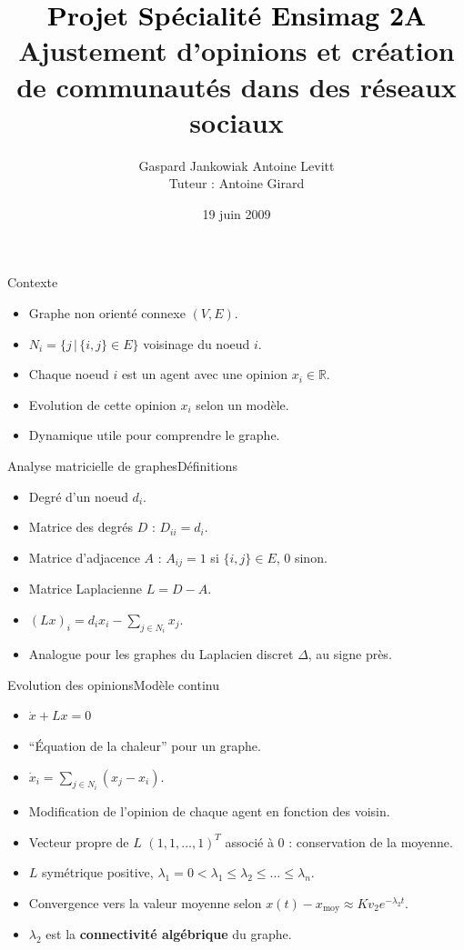 \documentclass{beamer}
\author{Gaspard Jankowiak \quad Antoine Levitt\\ Tuteur : Antoine Girard}
\title{{\textbf{\textcolor{black}{Projet Spécialité Ensimag 2A}}}\vspace{1cm}\\ {Ajustement d'opinions et création de communautés dans des réseaux
sociaux}}
\date{19 juin 2009}
\begin{document}
\begin{frame}
	\maketitle
\end{frame}

\begin{frame}{Contexte}
  \begin{itemize}
  \item Graphe non orienté connexe $(V, E)$.
  \item $N_i = \{j\, |\, \{i, j\} \in E\}$ voisinage du noeud $i$.
  \item Chaque noeud $i$ est un agent avec une opinion $x_i \in
    \mathbb {R}$.
  \item Evolution de cette opinion $x_i$ selon un modèle.
  \item Dynamique utile pour comprendre le graphe.
  \end{itemize}
\end{frame}

\begin{frame}{Analyse matricielle de graphes}{Définitions}
  \begin{itemize}
  \item Degré d'un noeud $d_i$.
  \item Matrice des degrés $D$ : $D_{i i} = d_i$.
  \item Matrice d'adjacence $A$ : $A_{i j} = 1$ si $\{i,j\} \in E$,
    $0$ sinon.
  \item Matrice Laplacienne $L = D - A$.
  \item $(L x)_i = d_i x_i - \sum_{j \in N_i} x_j$.
  \item Analogue pour les graphes du Laplacien discret $\Delta$, au signe près.
  \end{itemize}
\end{frame}

\begin{frame}{Evolution des opinions}{Modèle continu}
  \begin{itemize}
  \item   $\dot{x} + L x = 0$
  \item ``Équation de la chaleur'' pour un graphe.
  \item $\dot{x}_i = \sum_{j \in N_i} (x_j - x_i)$.
  \item Modification de l'opinion de chaque agent en fonction des voisin.
  \item Vecteur propre de $L$ $(1, 1, \dots, 1)^T$ associé à $0$ :
    conservation de la moyenne.
  \item $L$ symétrique positive, $\lambda_1 = 0 < \lambda_1 \leq
    \lambda_2 \leq \dots \leq \lambda_n$.
  \item Convergence vers la valeur moyenne selon $x(t) - x_\text{moy}
    \approx K v_2 e^{-\lambda_2 t}$.
  \item $\lambda_2$ est la {\bf connectivité algébrique} du graphe.
  \end{itemize}
\end{frame}
\end{document}
